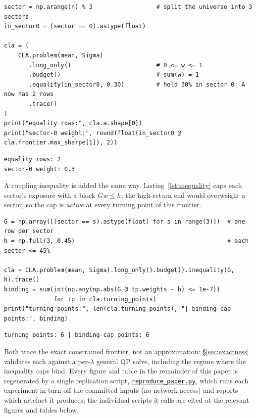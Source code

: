 \documentclass[11pt]{article}
\newcommand{\repourl}{https://github.com/cvxgrp/cvxcla}
\newcommand{\srcref}{v1.8.1}
\newcommand{\srcfile}[2]{\href{\repourl/blob/\srcref/#1}{\texttt{#2}}}
\begin{document}
\begin{lstlisting}[style=pyin,caption={A multi-row equality $A,b$: budget plus a
sector-neutrality row. Reuses \texttt{mean}, \texttt{Sigma} from
Listing~\ref{lst:basic}.},label={lst:equality}]
sector = np.arange(n) % 3                  # split the universe into 3 sectors
in_sector0 = (sector == 0).astype(float)

cla = (
    CLA.problem(mean, Sigma)
       .long_only()                        # 0 <= w <= 1
       .budget()                           # sum(w) = 1
       .equality(in_sector0, 0.30)         # hold 30% in sector 0: A now has 2 rows
       .trace()
)
print("equality rows:", cla.a.shape[0])
print("sector-0 weight:", round(float(in_sector0 @ cla.frontier.max_sharpe[1]), 2))
\end{lstlisting}

\begin{lstlisting}[style=pyout]
equality rows: 2
sector-0 weight: 0.3
\end{lstlisting}

A coupling inequality is added the same way. Listing~\ref{lst:inequality} caps each
sector's exposure with a block $G w \le h$; the high-return end would overweight a
sector, so the cap is \emph{active} at every turning point of this frontier.

\begin{lstlisting}[style=pyin,caption={An inequality block $G w \le h$: a
per-sector exposure cap, active along the whole trace.},label={lst:inequality}]
G = np.array([(sector == s).astype(float) for s in range(3)])  # one row per sector
h = np.full(3, 0.45)                                           # each sector <= 45%

cla = CLA.problem(mean, Sigma).long_only().budget().inequality(G, h).trace()
binding = sum(int(np.any(np.abs(G @ tp.weights - h) <= 1e-7))
              for tp in cla.turning_points)
print("turning points:", len(cla.turning_points), "| binding-cap points:", binding)
\end{lstlisting}

\begin{lstlisting}[style=pyout]
turning points: 6 | binding-cap points: 6
\end{lstlisting}

Both trace the exact constrained frontier, not an approximation:
\S\ref{sec:exactness} validates each against a per-$\lambda$ general QP solve,
including the regime where the inequality caps bind. Every figure
and table in the remainder of this paper is regenerated by a single replication
script, \srcfile{experiments/reproduce_paper.py}{reproduce\_paper.py},
which runs each experiment in turn off the committed inputs (no network access)
and reports which artefact it produces; the individual scripts it calls are cited
at the relevant figures and tables below.
\end{document}
